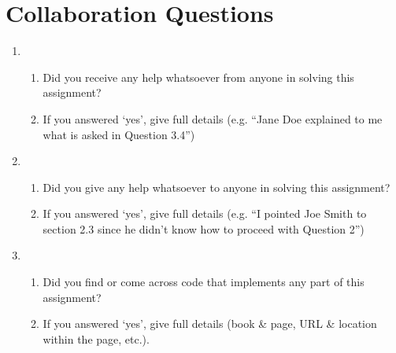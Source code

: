 \section{Collaboration Questions}

\begin{enumerate}
    \item 
    \begin{enumerate}
        \item Did you receive any help whatsoever from anyone in solving this assignment? 

        \item If you answered `yes', give full details (e.g. “Jane Doe explained to me what is asked in Question 3.4”)\\
        
        \begin{tcolorbox}[fit,height=4cm, width=15cm, blank, borderline={1pt}{-2pt},nobeforeafter]
        
        \end{tcolorbox}
        
    \end{enumerate}
    
    
    \item 
    \begin{enumerate}
        \item Did you give any help whatsoever to anyone in solving this assignment?
        
        \item If you answered `yes', give full details (e.g. “I pointed Joe Smith to section 2.3 since he didn’t know how to proceed with Question 2”)\\
        
        \begin{tcolorbox}[fit,height=4cm, width=15cm, blank, borderline={1pt}{-2pt},nobeforeafter]
        
        \end{tcolorbox}
        
    \end{enumerate}
    
    \item 
    \begin{enumerate}
        \item Did you find or come across code that implements any part of this assignment?
        
        \item If you answered `yes', give full details (book \& page, URL \& location within the page, etc.).\\
        
        \begin{tcolorbox}[fit,height=4cm, width=15cm, blank, borderline={1pt}{-2pt},nobeforeafter]

        
        \end{tcolorbox}
        
    \end{enumerate}
\end{enumerate}